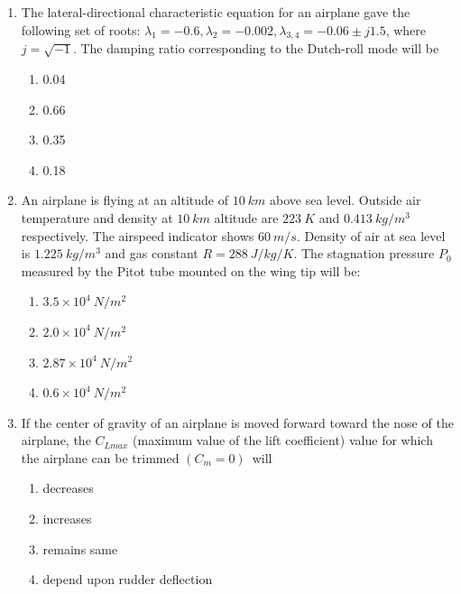 \documentclass{article}
\begin{document}
\begin{enumerate}
    \item The lateral-directional characteristic equation for an airplane gave the following set of roots: $\lambda_1 = -0.6, \lambda_2 = -0.002, \lambda_{3,4} = -0.06 \pm j1.5$, where $\textit{j} = \sqrt{-1}$. The damping ratio corresponding to the Dutch-roll mode will be
    \begin{multicols}{4}
    \begin{enumerate}
        \item 0.04
        \item 0.66
        \item 0.35
        \item 0.18
    \end{enumerate}
    \end{multicols}

    \item An airplane is flying at an altitude of $10\ km$ above sea level. Outside air temperature and density at $10\ km$ altitude are $223\ K$ and $0.413\ kg/m^3$ respectively. The airspeed indicator shows $60\ m/s$. Density of air at sea level is $1.225\ kg/m^3$ and gas constant $R = 288\ J/kg/K$. The stagnation pressure $P_0$ measured by the Pitot tube mounted on the wing tip will be:
    \begin{multicols}{4}
    \begin{enumerate}
        \item $3.5 \times 10^4\ N/m^2$
        \item $2.0 \times 10^4\ N/m^2$
        \item $2.87 \times 10^4\ N/m^2$
        \item $0.6 \times 10^4\ N/m^2$
    \end{enumerate}
    \end{multicols}

    \item If the center of gravity of an airplane is moved forward toward the nose of the airplane, the $C_{Lmax}$ (maximum value of the lift coefficient) value for which the airplane can be trimmed $(C_m = 0)$\ will
    \begin{multicols}{2}
    \begin{enumerate}
        \item decreases \quad
        \item increases \quad
        \item remains same \quad
        \item depend upon rudder deflection
    \end{enumerate}
    \end{multicols}


\end{enumerate}
\end{document}
